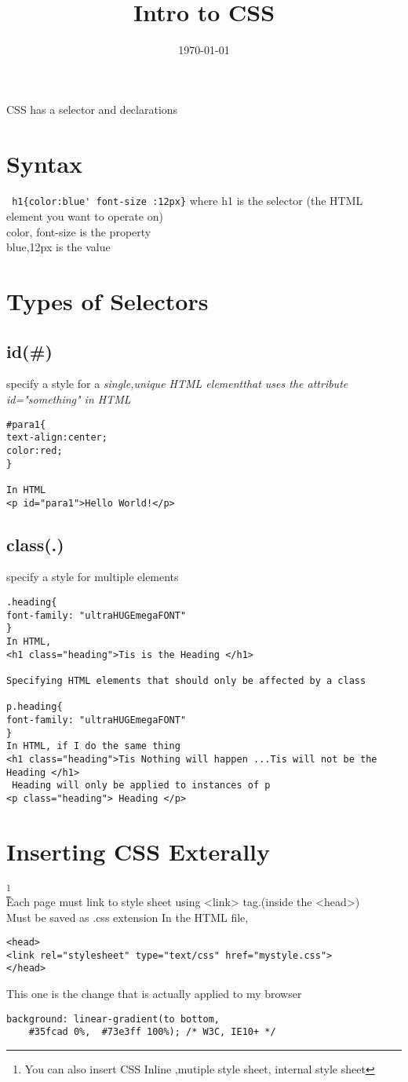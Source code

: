\documentclass[12 pt , twoside, letterpaper] {article}
\begin{document}
\title{Intro to CSS}
\date {\today}
CSS has a selector and declarations
\section{Syntax}
\verb! h1{color:blue' font-size :12px}!
where h1 is the selector (the HTML element you want to operate on)
\\color, font-size is the property
\\blue,12px is the value
\section{Types of Selectors}
\subsection{id(\#)}
specify a style for a \it single,unique HTML element\rm that uses the attribute id="something" in HTML
\begin {verbatim}
#para1{
text-align:center;
color:red;
}

In HTML
<p id="para1">Hello World!</p>
\end{verbatim}
\subsection{class(.)}
specify a style for multiple elements
\begin{verbatim}
.heading{
font-family: "ultraHUGEmegaFONT"
}
In HTML,
<h1 class="heading">Tis is the Heading </h1>

Specifying HTML elements that should only be affected by a class

p.heading{
font-family: "ultraHUGEmegaFONT"
}
In HTML, if I do the same thing
<h1 class="heading">Tis Nothing will happen ...Tis will not be the Heading </h1>
 Heading will only be applied to instances of p
<p class="heading"> Heading </p>

\end{verbatim}
\section{Inserting CSS Exterally}\footnote{You can also insert CSS Inline ,mutiple style sheet, internal style sheet }
\\Each page must link to style sheet using <link> tag.(inside the <head>)
\\Must be saved as .css extension
In the HTML file,
\begin{verbatim}
<head>
<link rel="stylesheet" type="text/css" href="mystyle.css">
</head>
\end{verbatim}
This one is the change that is actually applied to my browser    
\begin{verbatim}
background: linear-gradient(to bottom,  
    #35fcad 0%,  #73e3ff 100%); /* W3C, IE10+ */
\end{verbatim}
\end{document}
